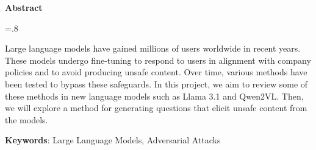 

\begin{latin}

    \begin{center}
    \textbf{Abstract}
    \end{center}
    \baselineskip=.8\baselineskip
    
    Large language models have gained millions of users worldwide in recent years. These models undergo fine-tuning to respond to users in alignment with company policies and to avoid producing unsafe content. Over time, various methods have been tested to bypass these safeguards. In this project, we aim to review some of these methods in new language models such as Llama 3.1 and Qwen2VL. Then, we will explore a method for generating questions that elicit unsafe content from the models.
    
    \bigskip\noindent\textbf{Keywords}:
    Large Language Models, Adversarial Attacks
    
    \end{latin}
    